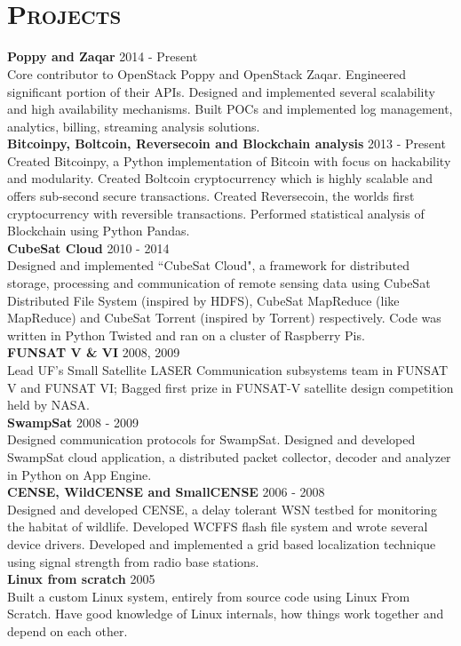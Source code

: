 \begin{resume}
\begin{formatb}
  \\
  \body\\
\end{formatb}

\section{\textsc{Projects}}
\textbf{Poppy and Zaqar} \hfill 2014 - Present\\
Core contributor to OpenStack Poppy and OpenStack Zaqar. Engineered significant portion of their APIs. Designed and implemented several scalability and high availability mechanisms. Built POCs and implemented log management, analytics, billing, streaming analysis solutions.\\
\textbf{Bitcoinpy, Boltcoin, Reversecoin and Blockchain analysis} \hfill 2013 - Present\\
Created Bitcoinpy, a Python implementation of Bitcoin with focus on hackability and modularity. Created Boltcoin cryptocurrency which is highly scalable and offers sub-second secure transactions. Created Reversecoin, the worlds first cryptocurrency with reversible transactions. Performed statistical analysis of Blockchain using Python Pandas.\\
\textbf{CubeSat Cloud} \hfill 2010 - 2014 \\
Designed and implemented ``CubeSat Cloud", a framework for distributed storage, processing and communication of remote sensing data using CubeSat Distributed File System (inspired by HDFS), CubeSat MapReduce (like MapReduce) and CubeSat Torrent (inspired by Torrent) respectively. Code was written in Python Twisted and ran on a cluster of Raspberry Pis.\\
\textbf{FUNSAT V \& VI} \hfill 2008, 2009 \\
Lead UF's Small Satellite LASER Communication subsystems team in FUNSAT V and FUNSAT VI; Bagged first prize in FUNSAT-V satellite design competition held by NASA.\\
\textbf{SwampSat} \hfill 2008 - 2009\\
Designed communication protocols for SwampSat. Designed and developed SwampSat cloud application, a distributed packet collector, decoder and analyzer in Python on App Engine.\\
\textbf{CENSE, WildCENSE and SmallCENSE} \hfill 2006 - 2008\\
Designed and developed CENSE, a delay tolerant WSN testbed for monitoring the habitat of wildlife. Developed WCFFS flash file system and wrote several device drivers. Developed and implemented a grid based localization technique using signal strength from radio base stations.\\
\textbf{Linux from scratch} \hfill 2005 \\
Built a custom Linux system, entirely from source code using Linux From Scratch. Have good knowledge of Linux internals, how things work together and depend on each other.


\end{resume}
